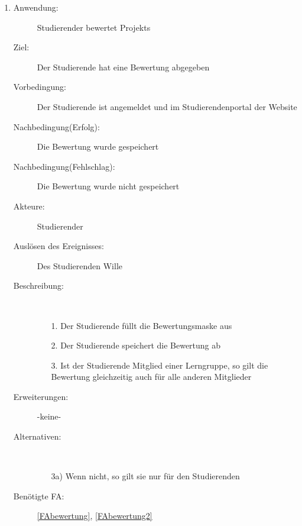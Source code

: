 \documentclass[parskip=full]{scrartcl}
\newcommand{\swtLabel}[1]{\textbf{/#1\arabic*0/}}
\begin{document}
\begin{enumerate}[label=\swtLabel{S}]
%   
  
  \item \label{UCstudBewertung}
  \begin{description}
  \item[Anwendung:] Studierender bewertet \glspl{Projekt}
  \item[Ziel:] Der Studierende hat eine Bewertung abgegeben
  	\item[Vorbedingung:] Der Studierende ist angemeldet und im Studierendenportal der
  	Website
  	\item[Nachbedingung(Erfolg):] Die Bewertung wurde gespeichert
  	\item[Nachbedingung(Fehlschlag):] Die Bewertung wurde nicht gespeichert
  	\item[Akteure:] Studierender
  	\item[Auslösen des Ereignisses:] Des Studierenden Wille
  	\item[Beschreibung:]~
  	 \begin{enumerate}
  	   \item[1.] Der Studierende füllt die Bewertungsmaske aus %
  	   \item[2.] Der Studierende speichert die Bewertung ab
  	   \item[3.] Ist der Studierende Mitglied einer \gls{Lerngruppe}, so gilt die
  	   Bewertung gleichzeitig auch für alle anderen Mitglieder
  	 \end{enumerate}
  	\item[Erweiterungen:] -keine-
  	\item[Alternativen:] ~
  	\begin{enumerate}
  	  \item[3a)] Wenn nicht, so gilt sie nur für den Studierenden
  	 \end{enumerate}
  	\item[Benötigte FA:] \ref{FAbewertung}, \ref{FAbewertung2}
  \end{description}
   

\end{enumerate}
\end{document}
